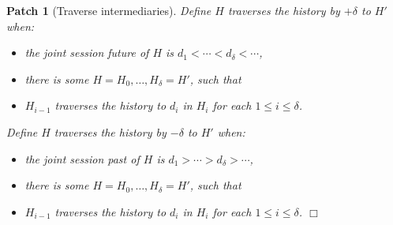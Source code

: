 \documentclass{notes}
\newcommand{\aNH}{H}
\newcommand{\ltChron}{<}
\newcommand{\gtChron}{>}
\newcommand{\aDoc}{d}
\newtheorem{patch}{Patch}
\newcommand{\QED}{\hfill$\Box$}
\begin{document}
\begin{patch}[Traverse intermediaries]
Define \emph{$\aNH$ traverses the history by $+\delta$ to $\aNH'$} when:
\begin{itemize}
\item the joint session future of $\aNH$ is $\aDoc_1 \ltChron \cdots \ltChron \aDoc_\delta \ltChron \cdots$,
\item there is some $\aNH=\aNH_0,\ldots,\aNH_\delta=\aNH'$, such that
\item $H_{i-1}$ traverses the history to $d_i$ in $H_i$ for each $1 \le i \le \delta$.
\end{itemize}
Define \emph{$\aNH$ traverses the history by $-\delta$ to $\aNH'$} when:
\begin{itemize}
\item the joint session past of $\aNH$ is $\aDoc_1 \gtChron \cdots \gtChron \aDoc_\delta \gtChron \cdots$,
\item there is some $\aNH=\aNH_0,\ldots,\aNH_\delta=\aNH'$, such that
\item $H_{i-1}$ traverses the history to $d_i$ in $H_i$ for each $1 \le i \le \delta$.
  \QED
\end{itemize}
\end{patch}
\end{document}
